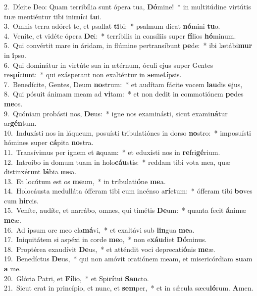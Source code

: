 {2.~}Dícite Deo: Quam terribília sunt ópera tua, \textbf{Dó}mine!~* in multitúdine virtútis tuæ mentiéntur tibi ini\textbf{mí}ci \textbf{tu}i.\\
{3.~}Omnis terra adóret te, et psallat \textbf{ti}bi:~* psalmum dicat \textbf{nó}mini \textbf{tu}o.\\
{4.~}Veníte, et vidéte ópera \textbf{De}i:~* terríbilis in consíliis super \textbf{fí}lios \textbf{hó}minum.\\
{5.~}Qui convértit mare in áridam, in flúmine pertransíbunt \textbf{pe}de:~* ibi lætábi\textbf{mur} in \textbf{i}pso.\\
{6.~}Qui dominátur in virtúte sua in ætérnum, óculi ejus super Gentes re\textbf{spí}ciunt:~* qui exásperant non exalténtur in \textbf{se}me\textbf{tí}psis.\\
{7.~}Benedícite, Gentes, Deum \textbf{no}strum:~* et audítam fácite vocem \textbf{lau}dis \textbf{e}jus,\\
{8.~}Qui pósuit ánimam meam ad \textbf{vi}tam:~* et non dedit in commotiónem \textbf{pe}des \textbf{me}os.\\
{9.~}Quóniam probásti nos, \textbf{De}us:~* igne nos examinásti, sicut exami\textbf{ná}tur ar\textbf{gén}tum.\\
{10.~}Induxísti nos in láqueum, posuísti tribulatiónes in dorso \textbf{no}stro:~* imposuísti hómines super \textbf{cá}pita \textbf{no}stra.\\
{11.~}Transívimus per ignem et \textbf{a}quam:~* et eduxísti nos in \textbf{re}fri\textbf{gé}rium.\\
{12.~}Introíbo in domum tuam in holo\textbf{cáu}stis:~* reddam tibi vota mea, quæ distinxérunt \textbf{lá}bia \textbf{me}a.\\
{13.~}Et locútum est os \textbf{me}um,~* in tribulati\textbf{ó}ne \textbf{me}a.\\
{14.~}Holocáusta medulláta ófferam tibi cum incénso a\textbf{rí}etum:~* ófferam tibi \textbf{bo}ves cum \textbf{hir}cis.\\
{15.~}Veníte, audíte, et narrábo, omnes, qui timétis \textbf{De}um:~* quanta fecit \textbf{á}nimæ \textbf{me}æ.\\
{16.~}Ad ipsum ore meo cla\textbf{má}vi,~* et exaltávi sub \textbf{lin}gua \textbf{me}a.\\
{17.~}Iniquitátem si aspéxi in corde \textbf{me}o,~* non e\textbf{xáu}diet \textbf{Dó}minus.\\
{18.~}Proptérea exaudívit \textbf{De}us,~* et atténdit voci deprecati\textbf{ó}nis \textbf{me}æ.\\
{19.~}Benedíctus \textbf{De}us,~* qui non amóvit oratiónem meam, et misericórdiam \textbf{su}am \textbf{a} me.\\
{20.~}Glória Patri, et \textbf{Fí}lio,~* et Spi\textbf{rí}tui \textbf{San}cto.\\
{21.~}Sicut erat in princípio, et nunc, et \textbf{sem}per,~* et in sǽcula sæcu\textbf{ló}rum. \textbf{A}men.\\
